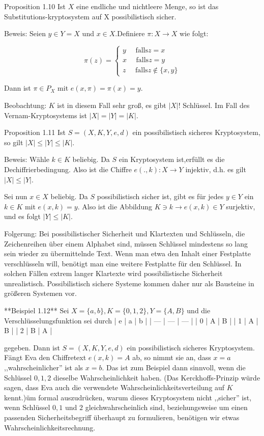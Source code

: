 \documentclass[a4paper]{article}
\begin{document}
\begin{multicols}{3}
    Proposition 1.10 Ist $X$ eine endliche und nichtleere Menge, so ist das Substitutions-kryptosystem auf X possibilistisch sicher.

    Beweis: Seien $y\in Y =X$ und $x\in X$.Definiere $\pi:X\rightarrow X$ wie folgt:

    $$\pi(z) =\begin{cases} y\quad\text{ falls} z=x\\ x\quad\text{ falls} z=y\\ z\quad\text{ falls} z\not\in\{x,y\} \end{cases}$$

    Dann ist $\pi\in P_X$ mit $e(x,\pi)=\pi(x)=y$.

    Beobachtung: $K$ ist in diesem Fall sehr groß, es gibt $|X|!$ Schlüssel. Im Fall des Vernam-Kryptosystems ist $|X|=|Y|=|K|$.

    Proposition 1.11 Ist $S=(X,K,Y,e,d)$ ein possibilistisch sicheres Kryptosystem, so gilt $|X|\leq|Y|\leq|K|$.

    Beweis: Wähle $k\in K$ beliebig. Da $S$ ein Kryptosystem ist,erfüllt es die Dechiffrierbedingung. Also ist die Chiffre $e(.,k):X\rightarrow Y$ injektiv, d.h. es gilt $|X|\leq |Y|$.

    Sei nun $x\in X$ beliebig. Da $S$ possibilistisch sicher ist, gibt es für jedes $y\in Y$ ein $k\in K$ mit $e(x,k) =y$. Also ist die Abbildung $K\ni k\rightarrow e(x,k)\in Y$ surjektiv, und es folgt $|Y|\leq |K|$.

    Folgerung: Bei possibilistischer Sicherheit und Klartexten und Schlüsseln, die Zeichenreihen über einem Alphabet sind, müssen Schlüssel mindestens so lang sein wieder zu übermittelnde Text. Wenn man etwa den Inhalt einer Festplatte verschlüsseln will, benötigt man eine weitere Festplatte für den Schlüssel. In solchen Fällen extrem langer Klartexte wird possibilistische Sicherheit unrealistisch. Possibilistisch sichere Systeme kommen daher nur als Bausteine in größeren Systemen vor.

    **Beispiel 1.12** Sei $X=\{a,b\},K=\{0,1,2\},Y=\{A,B\}$ und die Verschlüsselungsfunktion sei durch
    | e   | a   | b   |
    | --- | --- | --- |
    | 0   | A   | B   |
    | 1   | A   | B   |
    | 2   | B   | A   |

    gegeben. Dann ist $S=(X,K,Y,e,d)$ ein possibilistisch sicheres Kryptosystem. Fängt Eva den Chiffretext $e(x,k) =A$ ab, so nimmt sie an, dass $x=a$ ,,wahrscheinlicher'' ist als $x=b$.
    Das ist zum Beispiel dann sinnvoll, wenn die Schlüssel $0,1,2$ dieselbe Wahrscheinlichkeit haben.
    (Das Kerckhoffs-Prinzip würde sagen, dass Eva auch die verwendete Wahrscheinlichkeitsverteilung auf $K$ kennt.)üm formal auszudrücken, warum dieses Kryptosystem nicht ,,sicher'' ist, wenn Schlüssel $0,1$ und $2$ gleichwahrscheinlich sind, beziehungsweise um einen passenden Sicherheitsbegriff überhaupt zu formulieren, benötigen wir etwas Wahrscheinlichkeitsrechnung.


\end{multicols}
\end{document}
